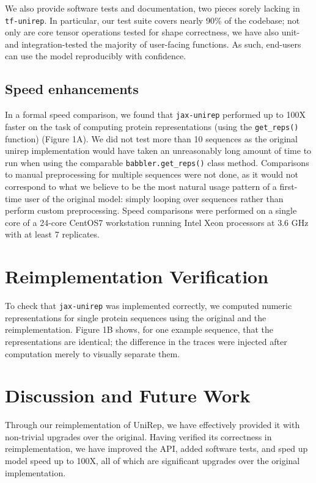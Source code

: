 \documentclass{bioinfo}
\begin{document}
We also provide software tests and documentation,
two pieces sorely lacking in \verb|tf-unirep|.
In particular, our test suite covers nearly 90\% of the codebase;
not only are core tensor operations tested for shape correctness,
we have also unit- and integration-tested
the majority of user-facing functions.
As such, end-users can use the model reproducibly with confidence.

\subsection{Speed enhancements}

In a formal speed comparison, we found that \verb|jax-unirep|
performed up to 100X faster on the task of computing protein representations
(using the \verb|get_reps()| function) (Figure 1A\vphantom{\ref{fig:01}}).
We did not test more than 10 sequences
as the original unirep implementation would have taken
an unreasonably long amount of time to run
when using the comparable \verb|babbler.get_reps()| class method.
Comparisons to manual preprocessing for multiple sequences were not done,
as it would not correspond to what we believe to be
the most natural usage pattern of a first-time user of the original model:
simply looping over sequences rather than perform custom preprocessing.
Speed comparisons were performed on a single core of a 24-core
CentOS7 workstation running Intel Xeon processors at 3.6 GHz
with at least 7 replicates.

\section{Reimplementation Verification}

To check that \verb|jax-unirep| was implemented correctly,
we computed numeric representations for single protein sequences
using the original and the reimplementation.
Figure 1B\vphantom{\ref{fig:01}} shows, for one example sequence,
that the representations are identical;
the difference in the traces were injected after computation
merely to visually separate them.

\section{Discussion and Future Work}

Through our reimplementation of UniRep,
we have effectively provided it with non-trivial upgrades over the original.
Having verified its correctness in reimplementation,
we have improved the API, added software tests,
and sped up model speed up to 100X,
all of which are significant upgrades over the original implementation.
\end{document}
